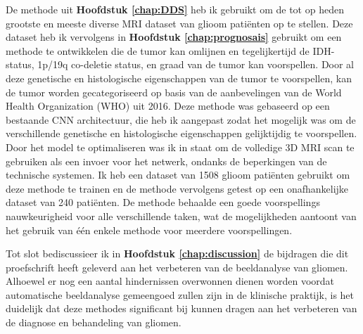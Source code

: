 De methode uit \textbf{Hoofdstuk \ref{chap:DDS}} heb ik gebruikt om de tot op heden grootste en meeste diverse MRI dataset van glioom pati{\"e}nten op te stellen.
Deze dataset heb ik vervolgens in \textbf{Hoofdstuk \ref{chap:prognosais}} gebruikt om een methode te ontwikkelen die de tumor kan omlijnen en tegelijkertijd de IDH-status, 1p/19q co-deletie status, en graad van de tumor kan voorspellen.
Door al deze genetische en histologische eigenschappen van de tumor te voorspellen, kan de tumor worden gecategoriseerd op basis van de aanbevelingen van de World Health Organization (WHO) uit 2016.
Deze methode was gebaseerd op een bestaande CNN architectuur, die heb ik aangepast zodat het mogelijk was om de verschillende genetische en histologische eigenschappen gelijktijdig te voorspellen.
Door het model te optimaliseren was ik in staat om de volledige 3D MRI scan te gebruiken als een invoer voor het netwerk, ondanks de beperkingen van de technische systemen.
Ik heb een dataset van 1508 glioom pati{\"e}nten gebruikt om deze methode te trainen en de methode vervolgens getest op een onafhankelijke dataset van 240 pati{\"e}nten.
De methode behaalde een goede voorspellings nauwkeurigheid voor alle verschillende taken, wat de mogelijkheden aantoont van het gebruik van {\'e}{\'e}n enkele methode voor meerdere voorspellingen.

Tot slot bediscussieer ik in \textbf{Hoofdstuk \ref{chap:discussion}} de bijdragen die dit proefschrift heeft geleverd aan het verbeteren van de beeldanalyse van gliomen.
Alhoewel er nog een aantal hindernissen overwonnen dienen worden voordat automatische beeldanalyse gemeengoed zullen zijn in de klinische praktijk, is het duidelijk dat deze methodes significant bij kunnen dragen aan het verbeteren van de diagnose en behandeling van gliomen.


